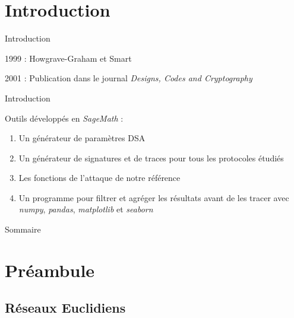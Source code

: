 \documentclass{backend/backend}
\begin{document}
\begin{frame}
    \titlepage
\end{frame}

\section*{Introduction}
\showtoctrue %

\begin{frame}{Introduction}
    
    \begin{block}{1999 : Howgrave-Graham et Smart \cite{latAtk}}
    \end{block}

    2001 : Publication dans le journal \textit{Designs, Codes and Cryptography}
    
\end{frame}

\begin{frame}{Introduction}
    
    Outils développés en \textit{SageMath} :

    \begin{enumerate}
        \item Un générateur de paramètres DSA
        \item Un générateur de signatures et de traces pour tous les protocoles étudiés
        \item Les fonctions de l'attaque de notre référence
        \item Un programme pour filtrer et agréger les résultats avant de les tracer avec \textit{numpy}, \textit{pandas}, \textit{matplotlib} et \textit{seaborn}
        
    \end{enumerate}
\end{frame}


\begin{frame}{Sommaire}

        \small
        \tableofcontents

\end{frame}





\section{Préambule} %
\subsection{Réseaux Euclidiens}
\end{document}
